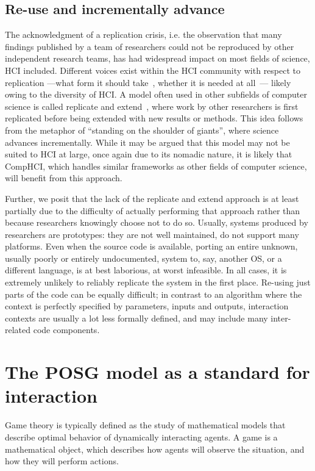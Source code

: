 \documentclass[12pt,a4paper]{article}
\begin{document}
\subsection{Re-use and incrementally advance \label{sub:replicate-extend}}
The acknowledgment of a replication crisis, i.e. the observation that many findings published by a team of researchers could not be reproduced by other independent research teams, has had widespread impact on most fields of science, HCI included. Different voices exist within the HCI community with respect to replication ---what form it should take~\cite{wilson2011}, whether it is needed at all~\cite{greiffenhagen2013}--- likely owing to the diversity of HCI. A model often used in other subfields of computer science is called replicate and extend~\cite{wilson2011}, where work by other researchers is first replicated before being extended with new results or methods. This idea follows from the metaphor of ``standing on the shoulder of giants'', where science advances incrementally. 
While it may be argued that this model may not be suited to HCI at large, once again due to its nomadic nature, it is likely that CompHCI, which handles similar frameworks as other fields of computer science, will benefit from this approach.


Further, we posit that the lack of the replicate and extend approach is at least partially due to the difficulty of actually performing that approach rather than because researchers knowingly choose not to do so.
Usually, systems produced by researchers are prototypes: they are not well maintained, do not support many platforms. Even when the source code is available, porting an entire unknown, usually poorly or entirely undocumented, system to, say, another OS, or a different language, is at best laborious, at worst infeasible.
In all cases, it is extremely unlikely to reliably replicate the system in the first place.
Re-using just parts of the code can be equally difficult; in contrast to an algorithm where the context is perfectly specified by parameters, inputs and outputs, interaction contexts are usually a lot less formally defined, and may include many inter-related code components.






\section{The POSG model as a standard for interaction}
Game theory is typically defined as the study of mathematical models that describe optimal behavior of dynamically interacting agents. A game is a mathematical object, which describes how agents will observe the situation, and how they will perform actions.
\end{document}
